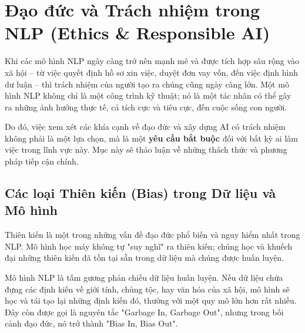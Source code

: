 
\section{Đạo đức và Trách nhiệm trong NLP (Ethics \& Responsible AI)}
\label{sec:dao_duc_trach_nhiem}

Khi các mô hình NLP ngày càng trở nên mạnh mẽ và được tích hợp sâu rộng vào xã hội -- từ việc quyết định hồ sơ xin việc, duyệt đơn vay vốn, đến việc định hình dư luận -- thì trách nhiệm của người tạo ra chúng cũng ngày càng lớn. Một mô hình NLP không chỉ là một công trình kỹ thuật; nó là một tác nhân có thể gây ra những ảnh hưởng thực tế, cả tích cực và tiêu cực, đến cuộc sống con người.

Do đó, việc xem xét các khía cạnh về đạo đức và xây dựng AI có trách nhiệm không phải là một lựa chọn, mà là một \textbf{yêu cầu bắt buộc} đối với bất kỳ ai làm việc trong lĩnh vực này. Mục này sẽ thảo luận về những thách thức và phương pháp tiếp cận chính.

\subsection{Các loại Thiên kiến (Bias) trong Dữ liệu và Mô hình}
\label{ssec:thien_kien_bias}

Thiên kiến là một trong những vấn đề đạo đức phổ biến và nguy hiểm nhất trong NLP. Mô hình học máy không tự "suy nghĩ" ra thiên kiến; chúng học và khuếch đại những thiên kiến đã tồn tại sẵn trong dữ liệu mà chúng được huấn luyện.

\begin{tcolorbox}[
    title={Nguyên tắc cốt lõi: ``Rác vào, Rác ra''},
    colback=red!5!white,
    colframe=red!75!black,
    fonttitle=\bfseries
]
Mô hình NLP là tấm gương phản chiếu dữ liệu huấn luyện. Nếu dữ liệu chứa đựng các định kiến về giới tính, chủng tộc, hay văn hóa của xã hội, mô hình sẽ học và tái tạo lại những định kiến đó, thường với một quy mô lớn hơn rất nhiều. Đây còn được gọi là nguyên tắc "Garbage In, Garbage Out", nhưng trong bối cảnh đạo đức, nó trở thành "Bias In, Bias Out".
\end{tcolorbox}

